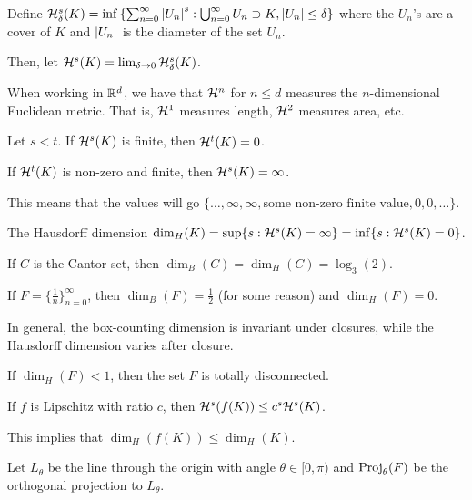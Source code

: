 \documentclass[class=pmath370,tikz,notes]{agony}
\begin{document}
\begin{defn}
  Define $\mathcal{H}_\delta^s(K) = \inf\qty{\sum_{n=0}^\infty \abs{U_n}^s : \bigcup_{n=0}^\infty U_n \supset K, \abs{U_n} \leq \delta}$
  where the $U_n$'s are a cover of $K$ and $\abs{U_n}$ is the diameter of the set $U_n$.

  Then, let $\mathcal{H}^s(K) = \lim_{\delta\to0} \mathcal{H}_\delta^s(K)$.
\end{defn}

When working in $\mathbb{R}^d$, we have that $\mathcal{H}^n$ for $n \leq d$
measures the $n$-dimensional Euclidean metric.
That is, $\mathcal{H}^1$ measures length, $\mathcal{H}^2$ measures area, etc.

\begin{fact}
  Let $s < t$. If $\mathcal{H}^s(K)$ is finite, then $\mathcal{H}^t(K) = 0$.

  If $\mathcal{H}^t(K)$ is non-zero and finite, then $\mathcal{H}^s(K) = \infty$.

  This means that the values will go $\{\dotsc,\infty,\infty,\text{some non-zero finite value},0,0,\dotsc\}$.
\end{fact}

\begin{defn}
  The Hausdorff dimension $\dim_H(K) = \sup\{s : \mathcal{H}^s(K) = \infty\} = \inf\{s : \mathcal{H}^s(K) = 0\}$.
\end{defn}

\begin{example}
  If $C$ is the Cantor set, then $\dim_B(C) = \dim_H(C) = \log_3(2)$.

  If $F = \{\frac1n\}_{n=0}^\infty$, then $\dim_B(F) = \frac12$ (for some reason)
  and $\dim_H(F) = 0$.
\end{example}

\begin{fact}
  In general, the box-counting dimension is invariant under closures,
  while the Hausdorff dimension varies after closure.
\end{fact}

\begin{fact}
  If $\dim_H(F) < 1$, then the set $F$ is totally disconnected.
\end{fact}

\begin{fact}
  If $f$ is Lipschitz with ratio $c$, then $\mathcal{H}^s(f(K)) \leq c^s\mathcal{H}^s(K)$.

  This implies that $\dim_H(f(K)) \leq \dim_H(K)$.
\end{fact}

Let $L_\theta$ be the line through the origin with angle $\theta \in [0,\pi)$
and $\operatorname{Proj}_\theta(F)$ be the orthogonal projection to $L_\theta$.
\end{document}

